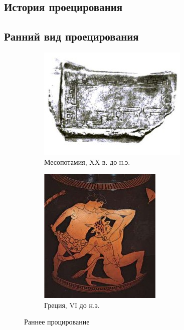 \documentclass[a4paper, 14pt]{extarticle}
\begin{document}
\subsection{История проецирования}
\subsection{Ранний вид проецирования}
\begin{figure}[h]
	\centering
	\begin{subfigure}[b]{0.45\textwidth}
		\centering
		\includegraphics[width=\textwidth]{l5/S001.jpg}
		\caption{Месопотамия, XX в. до н.э.}
		\label{ancientproj1}
	\end{subfigure}
	\begin{subfigure}[b]{0.45\textwidth}
		\centering
		\includegraphics[width=\textwidth]{l5/S002.jpg}
		\caption{Греция, VI до н.э.}
		\label{ancientproj2}
	\end{subfigure}
	\caption{Раннее процирование}
\end{figure}
\end{document}

